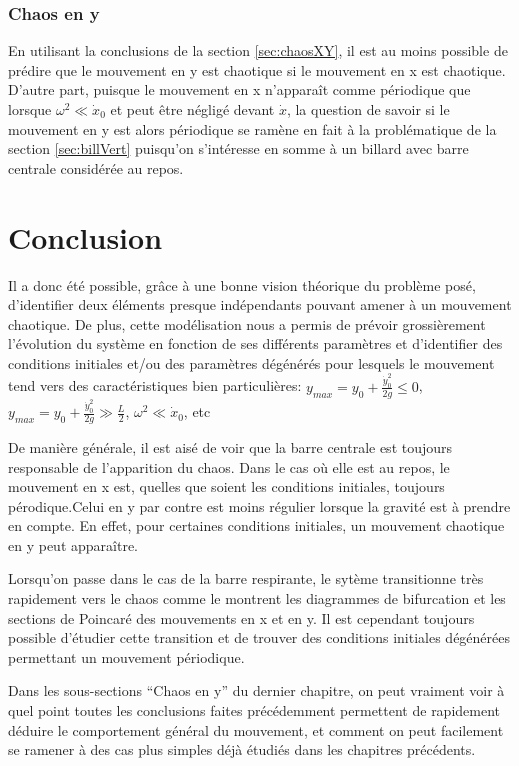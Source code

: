 \documentclass[a4paper]{report}
\begin{document}
\subsection{Chaos en y}
En utilisant la conclusions de la section \ref{sec:chaosXY}, il est au moins possible de prédire que le mouvement en y est chaotique si le mouvement en x est chaotique. D'autre part, puisque le mouvement en x n'apparaît comme périodique que lorsque \(\omega ^2 \ll \dot{x}_0 \) et peut être négligé devant \( \dot{x} \), la question de savoir si le mouvement en y est alors périodique se ramène en fait à la problématique de la section \ref{sec:billVert} puisqu'on s'intéresse en somme à un billard avec barre centrale considérée au repos.


\chapter{Conclusion}
Il a donc été possible, grâce à une bonne vision théorique du problème posé, d'identifier deux éléments presque indépendants pouvant amener à un mouvement chaotique. De plus, cette modélisation nous a permis de prévoir grossièrement l'évolution du système en fonction de ses différents paramètres et d'identifier des conditions initiales et/ou des paramètres dégénérés pour lesquels le mouvement tend vers des caractéristiques bien particulières: \(y_{max}=y_0+\frac{\dot{y}_0^2}{2g} \leq 0\), \(y_{max}=y_0+\frac{\dot{y}_0^2}{2g} \gg \frac{L}{2}\), \(\omega ^2 \ll \dot{x}_0 \), etc

De manière générale, il est aisé de voir que la barre centrale est toujours responsable de l'apparition du chaos. Dans le cas où elle est au repos, le mouvement en x est, quelles que soient les conditions initiales, toujours pérodique.Celui en y par contre est moins régulier lorsque la gravité est à prendre en compte. En effet, pour certaines conditions initiales, un mouvement chaotique en y peut apparaître. 

Lorsqu'on passe dans le cas de la barre respirante, le sytème transitionne très rapidement vers le chaos comme le montrent les diagrammes de bifurcation et les sections de Poincaré des mouvements en x et en y. Il est cependant toujours possible d'étudier cette transition et de trouver des conditions initiales dégénérées permettant un mouvement périodique.

Dans les sous-sections ``Chaos en y'' du dernier chapitre, on peut vraiment voir à quel point toutes les conclusions faites précédemment permettent de rapidement déduire le comportement général du mouvement, et comment on peut facilement se ramener à des cas plus simples déjà étudiés dans les chapitres précédents.




\end{document}
